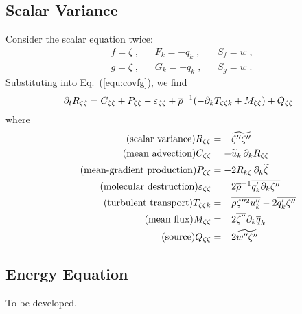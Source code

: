 \subsection{Scalar Variance}

Consider the scalar equation twice:
\begin{align}
  &f = \zeta\;, && F_k=-q_{k}\;, && S_f = w\;,\\
  &g = \zeta\;, && G_k=-q_{k}\;, && S_g = w\;.
\end{align}
Substituting into Eq.~(\ref{equ:covfg}), we find
\begin{equation}\label{equ:Rss}
  \pt{R_{\zeta \zeta}}{t}= C_{\zeta\zeta}+P_{\zeta\zeta} - \varepsilon_{\zeta\zeta}
  +\avr{\rho}^{-1} (- \pt{T_{\zeta\zeta k}}{k} +M_{\zeta\zeta} ) + Q_{\zeta\zeta}
\end{equation}
where
\begin{align}
  \tag{scalar variance}
    R_{\zeta \zeta} &=\phantom{-} \avf{\zeta''\zeta''}\\
  \tag{mean advection}
    C_{\zeta \zeta} &=-\avf{u}_k\,\pt{R_{\zeta \zeta}}{k}\\
  \tag{mean-gradient production}
    P_{\zeta \zeta} &=-2 R_{k \zeta}\,\pt{\avf{\zeta}}{k}\\
  \tag{molecular destruction}
    \varepsilon_{\zeta\zeta} &=\phantom{-} 2 \avr{\rho}^{-1}\avr{q_k' \pt{\zeta''}{k}}\\
  \tag{turbulent transport}
    T_{\zeta\zeta k}&=\phantom{-} \avr{\rho \zeta''^{2} u''_k } -2 \avr{q_k'\zeta''}\\
  \tag{mean flux}
    M_{\zeta\zeta}  &=\phantom{-} 2 \avr{\zeta^{''}} \pt{\avr{q}_k}{k}\\
  \tag{source}
    Q_{\zeta\zeta}  &=\phantom{-} 2 \avf{w''\zeta''}
\end{align}

\subsection{Energy Equation}

To be developed.

